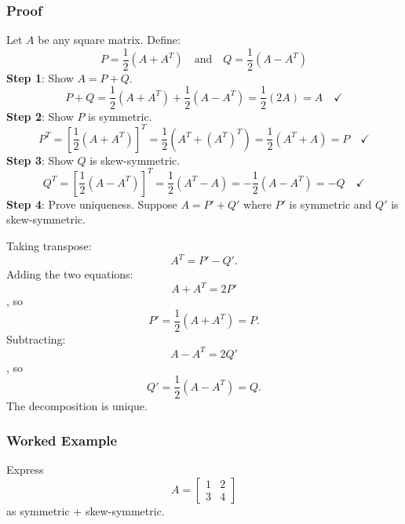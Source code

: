\documentclass[
]{article}
\begin{document}
\subsubsection{Proof}\label{proof-1}

Let \(A\) be any square matrix. Define:
\[
P = \frac{1}{2}(A + A^T) \quad \text{and} \quad Q = \frac{1}{2}(A - A^T)
\]
\textbf{Step 1}: Show \(A = P + Q\).
\[
P + Q = \frac{1}{2}(A + A^T) + \frac{1}{2}(A - A^T) = \frac{1}{2}(2A) = A \quad \checkmark
\]
\textbf{Step 2}: Show \(P\) is symmetric.
\[
P^T = \left[\frac{1}{2}(A + A^T)\right]^T = \frac{1}{2}(A^T + (A^T)^T) = \frac{1}{2}(A^T + A) = P \quad \checkmark
\]
\textbf{Step 3}: Show \(Q\) is skew-symmetric.
\[
Q^T = \left[\frac{1}{2}(A - A^T)\right]^T = \frac{1}{2}(A^T - A) = -\frac{1}{2}(A - A^T) = -Q \quad \checkmark
\]
\textbf{Step 4}: Prove uniqueness. Suppose \(A = P' + Q'\) where \(P'\)
is symmetric and \(Q'\) is skew-symmetric.

Taking transpose:
\[
A^T = P' - Q'.
\]
Adding the two equations:
\[
A + A^T = 2P'
\]
, so
\[
P' = \frac{1}{2}(A + A^T) = P.
\]
Subtracting:
\[
A - A^T = 2Q'
\]
, so
\[
Q' = \frac{1}{2}(A - A^T) = Q.
\]
The decomposition is unique.

\subsubsection{Worked Example}\label{worked-example}

Express
\[
A =
\begin{bmatrix}
1 & 2 \\
3 & 4
\end{bmatrix}
\]
as symmetric + skew-symmetric.
\end{document}
